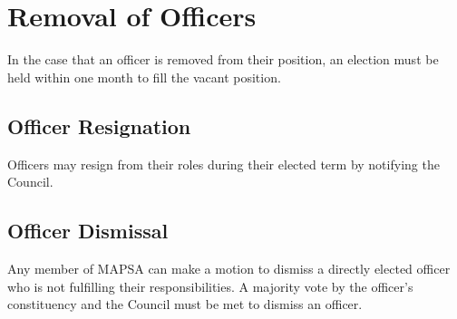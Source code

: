 \documentclass[11pt]{article}
\begin{document}
	\section{Removal of Officers}
	In the case that an officer is removed from their position, an election must be held within one month to fill the vacant position.
	
	\subsection{Officer Resignation}
	Officers may resign from their roles during their elected term by notifying the Council.
	
	\subsection{Officer Dismissal}
	Any member of MAPSA can make a motion to dismiss a directly elected officer who is not fulfilling their responsibilities. A majority vote by the officer's constituency and the Council must be met to dismiss an officer.
	
\end{document}
